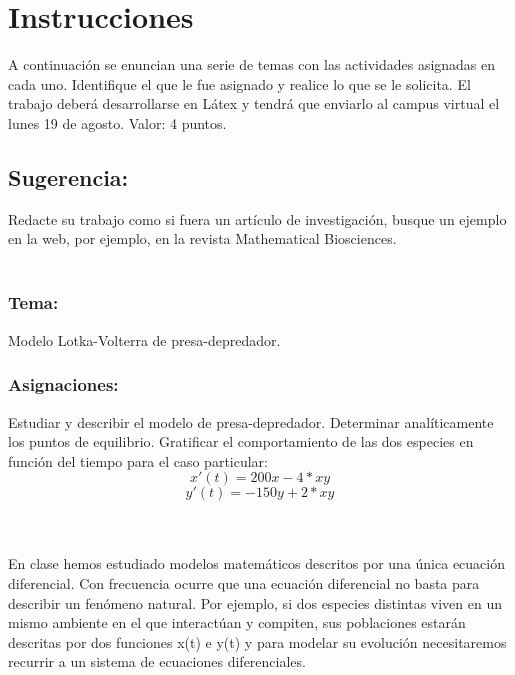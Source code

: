 \documentclass[10pt,letterpaper]{article}
\begin{document}
\pagebreak
 \thispagestyle{empty}
\section*{Instrucciones}
 A continuación se enuncian una serie de temas con las actividades asignadas en cada uno. Identifique el que le fue asignado y realice lo que se le solicita. El trabajo deberá desarrollarse en Látex y tendrá que enviarlo al campus virtual el lunes 19 de agosto. Valor: 4 puntos.
 
\subsection*{Sugerencia:} Redacte su trabajo como si fuera un artículo de investigación, busque un ejemplo en la web, por ejemplo, en la revista Mathematical Biosciences.\\ \\

\subsubsection*{Tema:} Modelo Lotka-Volterra de presa-depredador.
\subsubsection*{Asignaciones:} Estudiar y describir el modelo de presa-depredador. Determinar analíticamente los puntos de equilibrio. Gratificar el comportamiento de las dos especies en función del tiempo para el caso particular:\\

\[	x'(t)=200x-4*xy \]
\[	y'(t)=-150y+2*xy \]

\pagebreak 





\abstractname\\ \\ 
En clase hemos estudiado modelos matemáticos descritos por una única ecuación diferencial. Con frecuencia ocurre que una ecuación diferencial no basta para describir un fenómeno natural. Por ejemplo, si dos especies distintas viven en un mismo ambiente en el que interactúan y compiten, sus poblaciones estarán descritas por dos funciones x(t) e y(t) y para modelar su evolución necesitaremos recurrir a un sistema de ecuaciones diferenciales.\\ 
\end{document}
